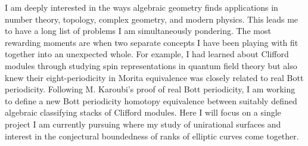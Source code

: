 \documentclass[11pt]{article}
\begin{document}


\pagestyle{fancy}
\setlength{\headheight}{15pt}
\setlength{\headsep}{0.2in}


I am deeply interested in the ways algebraic geometry finds applications in number theory, topology, complex geometry, and modern physics. This leads me to have a long list of problems I am simultaneously pondering. The most rewarding moments are when two separate concepts I have been playing with fit together into an unexpected whole. For example, I had learned about Clifford modules through studying spin representations in quantum field theory but also knew their eight-periodicity in Morita equivalence was closely related to real Bott periodicity. Following M. Karoubi's proof of real Bott periodicity, I am working to define a new Bott periodicity homotopy equivalence between suitably defined algebraic classifying stacks of Clifford modules. Here I will focus on a single project I am currently pursuing where my study of unirational surfaces and interest in the conjectural boundedness of ranks of elliptic curves come together. 
\end{document}
